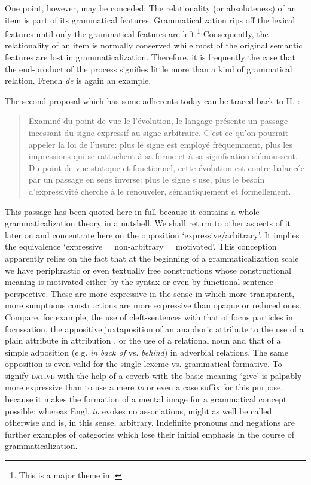 One point, however, may be conceded: The relationality (or absoluteness) of an item is part of its grammatical features. Grammaticalization rips off the lexical features until only the grammatical features are left.\footnote{This is a major theme in \citet{Givón1973}.} Consequently, the relationality of an item is normally conserved while most of the original semantic features are lost in grammaticalization. Therefore, it is frequently the case that the end-product of the process signifies little more than a kind of grammatical relation. French \textit{de} is again an example.

The second proposal which has some adherents today can be traced back to H. \citet[233]{Frei1929}:

\begin{quote}
Examiné du point de vue le l'évolution, le langage présente un passage incessant du signe expressif au signe arbitraire. C'est ce qu'on pourrait appeler la loi de l'usure: plus le signe est employé fréquemment, plus les impressions qui se rattachent à sa forme et à sa signification s'émoussent. Du point de vue statique et fonctionnel, cette évolution est contre-balancée par un passage en sens inverse: plus le signe s'use, plus le besoin d'expressivité cherche à le renouveler, sémantiquement et formellement.
\end{quote}

\noindent This passage has been quoted here in full because it contains a whole grammaticalization theory in a nutshell. We shall return to other aspects of it later on and concentrate here on the opposition ‘expressive/arbitrary’. It implies the equivalence ‘expressive = non-arbitrary = motivated’. This conception apparently relies on the fact that at the beginning of a grammaticalization scale we have periphrastic or even textually free constructions whose constructional meaning is motivated either by the syntax or even by functional sentence perspective. These are more expressive in the sense in which more transparent, more sumptuous constructions are more expressive than opaque or reduced ones. Compare, for example, the use of cleft-sentences with that of focus particles in focussation, the appositive juxtaposition of an anaphoric attribute to the use of a plain attribute in attribution%
, or the use of a relational noun and that of a simple adposition (e.g. \textit{in} \textit{back of} vs. \textit{behind}) in adverbial relations. The same opposition is even valid for the single lexeme vs. grammatical formative. To signify \textsc{dative} with the help of a coverb with the basic meaning ‘give’ is palpably more expressive than to use a mere \textit{to} or even a case suffix for this purpose, because it makes the formation of a mental image for a grammatical concept possible; whereas Engl. \textit{to} evokes no associations, might as well be called otherwise and is, in this sense, arbitrary. Indefinite pronouns and negations are further examples of categories which lose their initial emphasis in the course of grammaticalization.

